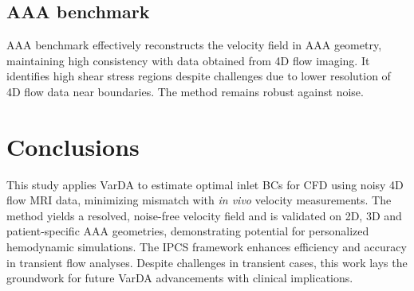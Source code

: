 \subsection*{AAA benchmark}
AAA benchmark effectively reconstructs the velocity field in AAA geometry, maintaining high consistency with data obtained from 4D flow
imaging. It identifies high shear stress regions despite challenges due to lower resolution of 4D flow data near boundaries. The method remains robust against noise. 


\section*{Conclusions}
This study applies VarDA to estimate optimal inlet BCs for CFD using noisy 4D flow MRI data, minimizing mismatch with \textit{in vivo} velocity measurements.
The method yields a resolved, noise-free velocity field and is validated on 2D, 3D and patient-specific AAA geometries, demonstrating potential for personalized hemodynamic simulations.
The IPCS framework enhances efficiency and accuracy in transient flow analyses. Despite challenges in transient cases, this work lays the groundwork for future VarDA advancements with clinical implications.






